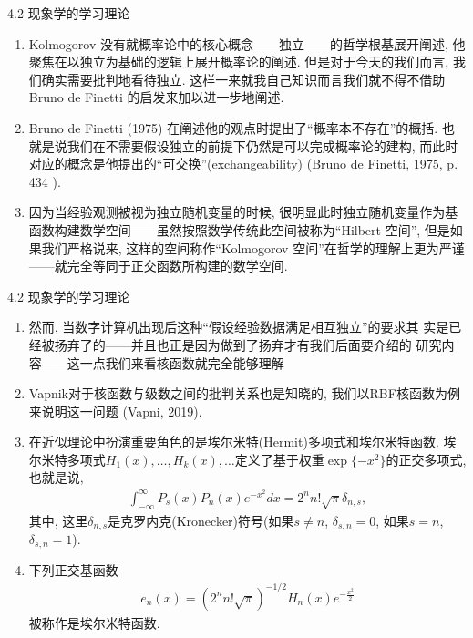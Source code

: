 \documentclass[compress,10pt,dvipsnames,notheorems]{beamer} %
\begin{document}
\begin{frame}{4.2 现象学的学习理论}
\begin{enumerate}
\item Kolmogorov 没有就概率论中的核心概念——独立——的哲学根基展开阐述,
他聚焦在以独立为基础的逻辑上展开概率论的阐述. 但是对于今天的我们而言,
我们确实需要批判地看待独立. 这样一来就我自己知识而言我们就不得不借助
Bruno de Finetti 的启发来加以进一步地阐述. 
\item Bruno de Finetti (1975) 在阐述他的观点时提出了“概率本不存在”的概括. 也就是说我们在不需要假设独立的前提下仍然是可以完成概率论的建构, 而此时对应的概念是他提出的“可交换”(exchangeability) (Bruno de Finetti, 1975, p. 434 ). 
\item 因为当经验观测被视为独立随机变量的时候, 很明显此时独立随机变量作为基函数构建数学空间——虽然按照数学传统此空间被称为“Hilbert 空间”, 但是如果我们严格说来, 这样的空间称作“Kolmogorov 空间”在哲学的理解上更为严谨——就完全等同于正交函数所构建的数学空间.
\end{enumerate}
\end{frame}

\begin{frame}{4.2 现象学的学习理论}
\begin{enumerate}
\item 然而, 当数字计算机出现后这种“假设经验数据满足相互独立”的要求其
实是已经被扬弃了的——并且也正是因为做到了扬弃才有我们后面要介绍的
研究内容——这一点我们来看核函数就完全能够理解
\item Vapnik对于核函数与级数之间的批判关系也是知晓的, 我们以RBF核函数为例来说明这一问题 (Vapni, 2019). 
\item 在近似理论中扮演重要角色的是埃尔米特(Hermit)多项式和埃尔米特函数. 埃尔米特多项式$H_{1}(x),\ldots,H_{k}(x),\ldots$定义了基于权重$\exp\{-x^{2}\}$的正交多项式, 也就是说,
\begin{align*}
\int_{-\infty}^{\infty} P_{s}(x)P_{n}(x)e^{-x^{2}}dx = 2^{n}n!\sqrt{\pi}\delta_{n,s},
\end{align*}
其中, 这里$\delta_{n,s}$是克罗内克(Kronecker)符号(如果$s \neq n$, $\delta_{s,n} = 0$, 如果$s=n$, $\delta_{s,n} = 1$).
\item 下列正交基函数
\begin{align*}
e_{n}(x) = (2^{n}n!\sqrt{\pi})^{-1/2}H_{n}(x)e^{-\frac{x^{2}}{2}}
\end{align*}
被称作是埃尔米特函数.
\end{enumerate}
\end{frame}
\end{document}
